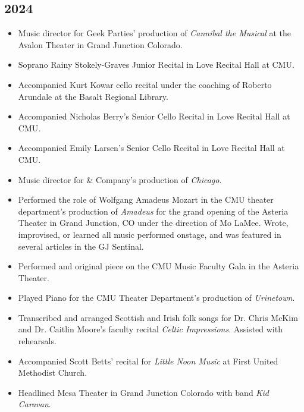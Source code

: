 \documentclass{article}
\newcommand{\cvItem}[1]{
        \item {
            {#1}
        }
    }
\newcommand{\cvItemListStart}{\begin{itemize}[leftmargin=10pt]}
\newcommand{\cvItemListEnd}{\end{itemize}}
\begin{document}
        \subsection{2024}
            \cvItemListStart
                \cvItem{Music director for Geek Parties' production of {\em Cannibal the Musical} at
                the Avalon Theater in Grand Junction Colorado.}
                \cvItem{Soprano Rainy Stokely-Graves Junior Recital in Love Recital Hall at CMU.}
                \cvItem{Accompanied Kurt Kowar cello recital under the coaching of Roberto Arundale
                at the Basalt Regional Library.}
                \cvItem{Accompanied Nicholas Berry's Senior Cello Recital in Love Recital Hall at
                CMU.}
                \cvItem{Accompanied Emily Larsen's Senior Cello Recital in Love Recital Hall at CMU.}
                \cvItem{Music director for \& Company's production of {\em Chicago}.}
                \cvItem{Performed the role of Wolfgang Amadeus Mozart in the CMU theater
                department's production of {\em Amadeus} for the grand opening of the Asteria
                Theater in Grand Junction, CO under the direction of Mo LaMee. Wrote, improvised, or
                learned all music performed onstage, and was featured in several articles in the GJ
                Sentinal.}
                \cvItem{Performed and original piece on the CMU Music Faculty Gala in the Asteria
                Theater.}
                \cvItem{Played Piano for the CMU Theater Department's production of {\em
                Urinetown}.}
                \cvItem{Transcribed and arranged Scottish and Irish folk songs for Dr. Chris McKim and
                Dr. Caitlin Moore's faculty recital {\em Celtic Impressions}. Assisted with
                rehearsals.}
                \cvItem{Accompanied Scott Betts' recital for {\em Little Noon Music} at First United
                Methodist Church.}
                \cvItem{Headlined Mesa Theater in Grand Junction Colorado with band {\em Kid
                Caravan}.}
            \cvItemListEnd
\end{document}
